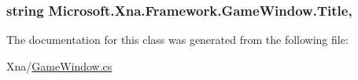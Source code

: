 \subsubsection[{Title}]{\setlength{\rightskip}{0pt plus 5cm}string Microsoft.\+Xna.\+Framework.\+Game\+Window.\+Title\hspace{0.3cm}{\ttfamily [get]}, {\ttfamily [set]}}\label{class_microsoft_1_1_xna_1_1_framework_1_1_game_window_a6bc8d6487c96d42c75846b315ed82a70}


The documentation for this class was generated from the following file\+:\begin{DoxyCompactItemize}
\item 
Xna/\hyperlink{_game_window_8cs}{Game\+Window.\+cs}\end{DoxyCompactItemize}
